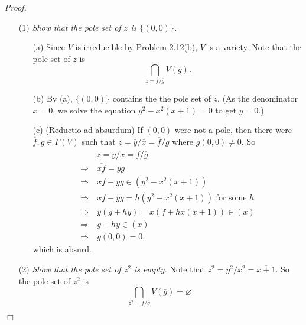 \documentclass{article}
\begin{document}
\emph{Proof.}
\begin{enumerate}
\item[(1)]
  \emph{Show that the pole set of $z$ is $\{(0,0)\}$.}
  \begin{enumerate}
  \item[(a)]
    Since $V$ is irreducible by Problem 2.12(b), $V$ is a variety.
    Note that the pole set of $z$ is
    \[
      \bigcap_{z = \overline{f}/\overline{g}} V(\overline{g}).
    \]

  \item[(b)]
    By (a), $\{ (0,0) \}$ contains the the pole set of $z$.
    (As the denominator $x = 0$, we solve the equation $y^2 - x^2(x+1) = 0$ to get $y = 0$.)

  \item[(c)]
    (Reductio ad absurdum)
    If $(0,0)$ were not a pole, then there were $\overline{f}, \overline{g} \in \Gamma(V)$
    such that $z = \overline{y}/\overline{x} = \overline{f}/\overline{g}$ where $\overline{g}(0,0) \neq 0$.
    So
    \begin{align*}
      & \: z = \overline{y}/\overline{x} = \overline{f}/\overline{g} \\
      \Longrightarrow & \:
      \overline{xf} = \overline{yg} \\
      \Longrightarrow & \:
      xf - yg \in (y^2 - x^2(x+1)) \\
      \Longrightarrow & \:
      xf - yg = h(y^2 - x^2(x+1)) \text{ for some $h$} \\
      \Longrightarrow & \:
      y(g + hy) = x(f + hx(x+1)) \in (x) \\
      \Longrightarrow & \:
      g + hy \in (x) \\
     \Longrightarrow & \:
      g(0,0) = 0,
    \end{align*}
    which is absurd.
  \end{enumerate}

\item[(2)]
\emph{Show that the pole set of $z^2$ is empty.}
  Note that
  $z^2 = \overline{y^2}/\overline{x^2} = \overline{x+1}$.
  So the pole set of $z^2$ is
  \[
    \bigcap_{z^2 = \overline{f}/\overline{g}} V(\overline{g}) = \varnothing.
  \]
\end{enumerate}
$\Box$ \\\\



\end{document}
